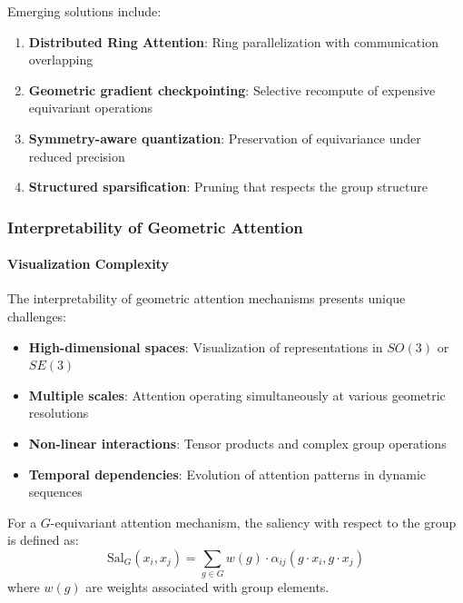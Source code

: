 Emerging solutions include:

\begin{enumerate}
    \item \textbf{Distributed Ring Attention}: Ring parallelization with communication overlapping
    \item \textbf{Geometric gradient checkpointing}: Selective recompute of expensive equivariant operations
    \item \textbf{Symmetry-aware quantization}: Preservation of equivariance under reduced precision
    \item \textbf{Structured sparsification}: Pruning that respects the group structure
\end{enumerate}

\subsubsection{Interpretability of Geometric Attention}

\paragraph{Visualization Complexity}

The interpretability of geometric attention mechanisms presents unique challenges:

\begin{itemize}
    \item \textbf{High-dimensional spaces}: Visualization of representations in $SO(3)$ or $SE(3)$
    \item \textbf{Multiple scales}: Attention operating simultaneously at various geometric resolutions
    \item \textbf{Non-linear interactions}: Tensor products and complex group operations
    \item \textbf{Temporal dependencies}: Evolution of attention patterns in dynamic sequences
\end{itemize}

\begin{definition}
For a $G$-equivariant attention mechanism, the saliency with respect to the group is defined as:
\begin{equation}
\text{Sal}_G(x_i, x_j) = \sum_{g \in G} w(g) \cdot \alpha_{ij}(g \cdot x_i, g \cdot x_j)
\label{eq:geometric_saliency}
\end{equation}
where $w(g)$ are weights associated with group elements.
\end{definition}

